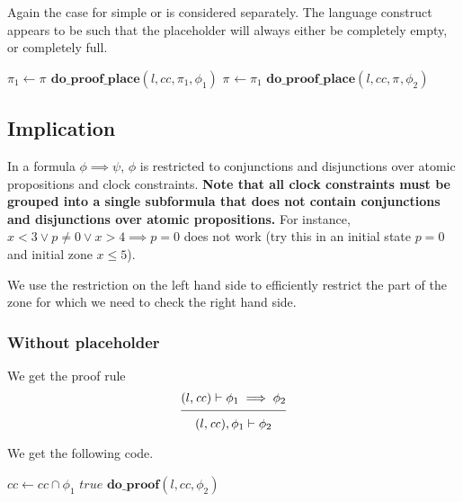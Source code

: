 \documentclass{article}
\newcommand{\proofrule}[3][]{#1 \frac{\raisebox{.7ex}{\normalsize{$#2$}}}
  {\raisebox{-1.0ex}{\normalsize{$#3$}}}}
\newcommand{\placeholder}[1][]{\pi_{#1}}
\newcommand{\loc}{l}
\newcommand{\region}{\mathit{cc}}
\newcommand{\method}[1]{\ensuremath{\mathbf{#1}}}
\begin{document}
Again the case for simple or is considered separately. The language construct appears to be such that
the placeholder will always either be completely empty, or completely full.
\begin{algorithm}[H]
\caption{$\method{do\_proof\_place\_or\_simple}(\loc, \region, \placeholder, \phi_1 \lor \phi_2)$}
\begin{algorithmic}
\STATE $\placeholder[1] \gets \placeholder$
\STATE $\method{do\_proof\_place}(\loc, \region, \placeholder[1], \phi_1)$
\IF{$\placeholder[1] = \placeholder$}
  \STATE $\placeholder \gets \placeholder[1]$
\ELSE
  \STATE $\method{do\_proof\_place}(\loc, \region, \placeholder, \phi_2)$
\ENDIF
\end{algorithmic}
\end{algorithm}

\subsection{Implication}
In a formula $\phi \implies \psi$, $\phi$ is restricted to conjunctions and disjunctions over atomic propositions and clock constraints. \textbf{Note that all clock constraints must be grouped into a single subformula that does not contain conjunctions and disjunctions over atomic propositions.} For instance, $x < 3 \lor p \neq 0 \lor x > 4 \implies p = 0$ does not work (try this in an initial state $p=0$ and initial zone $x \leq 5$).


We use the restriction on the left hand side to efficiently restrict the part of the zone for which we need to check the right hand side.

\subsubsection{Without placeholder}

We get the proof rule
\[
\proofrule
{(\loc, \region) \vdash \phi_1 \implies \phi_2}
{(\loc, \region), \phi_1 \vdash \phi_2}
\]

We get the following code.
\begin{algorithm}[H]
  \caption{$\method{do\_proof\_imply}(\loc, \region, \phi_1 \implies \phi_2)$}
  \begin{algorithmic}
  \STATE $\region \gets \region \cap \phi_1$
  \IF{$\region = \emptyset$}
    \RETURN $\mathit{true}$
  \ELSE
    \RETURN $\method{do\_proof}(\loc, \region, \phi_2)$
  \ENDIF
  \end{algorithmic}
\end{algorithm}
\end{document}
